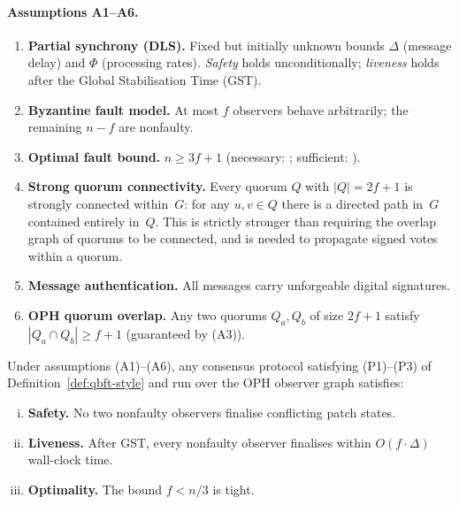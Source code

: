 \paragraph{Assumptions A1--A6.}
\begin{enumerate}[(A1)]
  \item \textbf{Partial synchrony (DLS).}
        Fixed but initially unknown bounds $\Delta$ (message delay) and
        $\Phi$ (processing rates).
        \emph{Safety} holds unconditionally;
        \emph{liveness} holds after the Global Stabilisation Time (\textrm{GST}).
  \item \textbf{Byzantine fault model.}
        At most $f$ observers behave arbitrarily; the remaining $n-f$ are nonfaulty.
  \item \textbf{Optimal fault bound.}
        $n \geq 3f+1$ (necessary: \cite{Lamport1982}; sufficient: \cite{Lamport1982}).
  \item \textbf{Strong quorum connectivity.}
        Every quorum $Q$ with $|Q|=2f+1$ is strongly connected within~$G$:
        for any $u,v\in Q$ there is a directed path in~$G$ contained
        entirely in~$Q$.
        This is strictly stronger than requiring the overlap graph of
        quorums to be connected, and is needed to propagate signed votes
        within a quorum.
  \item \textbf{Message authentication.}
        All messages carry unforgeable digital signatures.
  \item \textbf{OPH quorum overlap.}
        Any two quorums $Q_a, Q_b$ of size $2f+1$ satisfy
        $|Q_a\cap Q_b|\geq f+1$ (guaranteed by (A3)).
\end{enumerate}

\begin{theorem}
\label{thm:qbft-safety}
Under assumptions (A1)--(A6), any consensus protocol satisfying
(P1)--(P3) of Definition~\ref{def:qbft-style} and run over the
\textrm{OPH} observer graph satisfies:
\begin{enumerate}[(i)]
  \item \textbf{Safety.} No two nonfaulty observers finalise conflicting
        patch states.
  \item \textbf{Liveness.} After \textrm{GST}, every nonfaulty observer
        finalises within $O(f\cdot\Delta)$ wall-clock time.
  \item \textbf{Optimality.} The bound $f<n/3$ is tight.
\end{enumerate}
\end{theorem}

